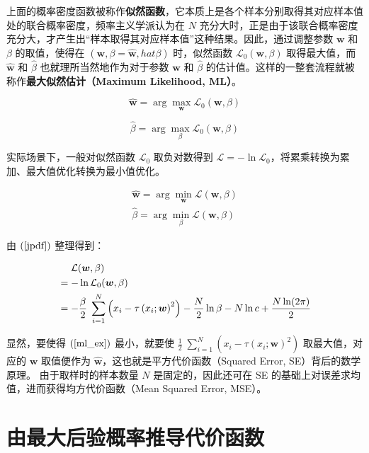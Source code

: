 \documentclass[UTF8, a4paper, oneside]{article}
\begin{document}
上面的概率密度函数被称作\textbf{似然函数}，它本质上是各个样本分别取得其对应样本值处的联合概率密度，频率主义学派认为在 $N$ 充分大时，正是由于该联合概率密度充分大，才产生出“样本取得其对应样本值”这种结果。因此，通过调整参数 $\boldsymbol{w}$ 和 $\beta$ 的取值，使得在 $(\boldsymbol{w}, \beta = \boldsymbol{\hat{w}}, hat{\beta})$ 时，似然函数 $\mathcal{L}_0(\boldsymbol{w}, \beta)$ 取得最大值，而 $\boldsymbol{\hat{w}}$ 和 $\hat{\beta}$ 也就理所当然地作为对于参数 $\boldsymbol{w}$ 和 $\hat{\beta}$ 的估计值。这样的一整套流程就被称作\textbf{最大似然估计（Maximum Likelihood, ML）}。

$$\boldsymbol{\hat{w}} = \arg \max_{\boldsymbol{w}} \mathcal{L}_0(\boldsymbol{w}, \beta)$$

$$\hat{\beta} = \arg \max_{\beta} \mathcal{L}_0(\boldsymbol{w}, \beta)$$

实际场景下，一般对似然函数 $\mathcal{L}_0$ 取负对数得到 $\mathcal{L} = -\ln \mathcal{L}_0$，将累乘转换为累加、最大值优化转换为最小值优化。

\begin{gather}
\boldsymbol{\hat{w}} = \arg \min_{\boldsymbol{w}} \mathcal{L}(\boldsymbol{w}, \beta)\\
\hat{\beta} = \arg \min_{\beta} \mathcal{L}(\boldsymbol{w}, \beta)
\end{gather}

由 $(\ref{jpdf})$ 整理得到：

\begin{align} \label{ml_ex}
&\mathrel{\phantom{=}}
\mathcal{L}(\boldsymbol{w}, \beta) \notag \\
&=-\ln \mathcal{L}_0(\boldsymbol{w}, \beta) \notag \\
&=-\frac{\beta}{2}\;\sum_{i=1}^{N}\left(x_i-\tau\left(x_i;\boldsymbol{w}\right)^2\right) - \frac{N}{2} \ln{\beta} - N \ln c + \frac{N \ln (2\pi)}{2}
\end{align}

显然，要使得 $(\ref{ml_ex})$ 最小，就要使 $\frac{1}{2}\;\sum_{i=1}^{N}\left(x_i-\tau\left(x_i;\boldsymbol{w}\right)^2\right)$ 取最大值，对应的 $\boldsymbol{w}$ 取值便作为 $\boldsymbol{\hat{w}}$，这也就是平方代价函数（Squared Error, SE）背后的数学原理。
由于取样时的样本数量 $N$ 是固定的，因此还可在 SE 的基础上对误差求均值，进而获得均方代价函数（Mean Squared Error, MSE）。

\section{由最大后验概率推导代价函数}
\end{document}
